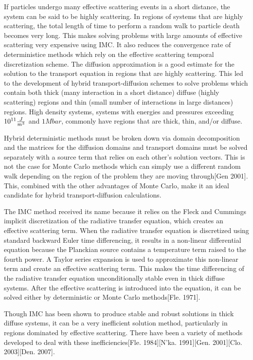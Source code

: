 	If particles undergo many effective scattering events in a short distance, the system can be said to be highly scattering. In regions of systems that are highly scattering, the total length of time to perform a random walk to particle death becomes very long. This makes solving problems with large amounts of effective scattering very expensive using IMC. It also reduces the convergence rate of deterministice methods which rely on the effective scattering temporal discretization scheme. The diffusion approximation is a good estimate for the solution to the transport equation in regions that are highly scattering. This led to the development of hybrid transport-diffusion schemes to solve problems which contain both thick (many interaction in a short distance) diffuse (highly scattering) regions and thin (small number of interactions in large distances) regions. High density systems, systems with energies and pressures exceeding $10^{11} {J\over{m^3}}$ and $1 Mbar$, commonly have regions that are thick, thin, and/or diffuse.

	Hybrid deterministic methods must be broken down via domain decomposition and the matrices for the diffusion domains and transport domains must be solved separately with a source term that relies on each other's solution vectors. This is not the case for Monte Carlo methods which can simply use a different random walk depending on the region of the problem they are moving through[Gen 2001]. This, combined with the other advantages of Monte Carlo, make it an ideal candidate for hybrid transport-diffusion calculations.

	The IMC method received its name because it relies on the Fleck and Cummings implicit discretization of the radiative transfer equation, which creates an effective scattering term. When the radiative transfer equation is discretized using standard backward Euler time differencing, it results in a non-linear differential equation because the Planckian source contains a temperature term raised to the fourth power. A Taylor series expansion is used to approximate this non-linear term and create an effective scattering term. This makes the time differencing of the radiative transfer equation unconditionally stable even in thick diffuse systems. After the effective scattering is introduced into the equation, it can be solved either by deterministic or Monte Carlo methods[Fle. 1971].

	Though IMC has been shown to produce stable and robust solutions in thick diffuse systems, it can be a very inefficient solution method, particularly in regions dominated  by effective scattering. There have been a variety of methods developed to deal with these inefficiencies[Fle. 1984][N'ka. 1991][Gen. 2001][Clo. 2003][Den. 2007].

